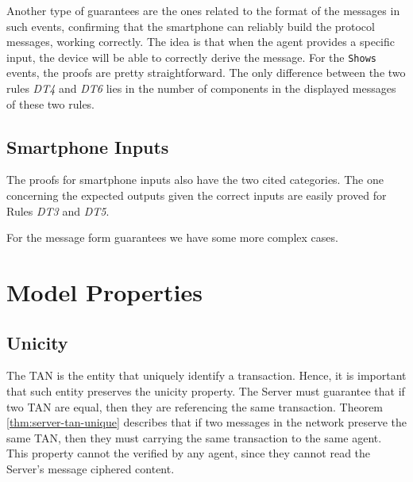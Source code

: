 Another type of guarantees are the ones related to the format of the messages in such events, confirming that the smartphone can reliably build the protocol messages, working correctly. The idea is that when the agent provides a specific input, the device will be able to correctly derive the message. For the \texttt{Shows} events, the proofs are pretty straightforward. The only difference between the two rules \textit{DT4} and \textit{DT6} lies in the number of components in the displayed messages of these two rules.


\subsection{Smartphone Inputs}
The proofs for smartphone inputs also have the two cited categories. The one concerning the expected outputs given the correct inputs are easily proved for Rules \textit{DT3} and \textit{DT5}.

For the message form guarantees we have some more complex cases.




\section{Model Properties}

\subsection{Unicity}
The TAN is the entity that uniquely identify a transaction. Hence, it is important that such entity preserves the unicity property. The Server must guarantee that if two TAN are equal, then they are referencing the same transaction. Theorem \ref{thm:server-tan-unique} describes that if two messages in the network preserve the same TAN, then they must carrying the same transaction to the same agent. This property cannot the verified by any agent, since they cannot read the Server's message ciphered content.

